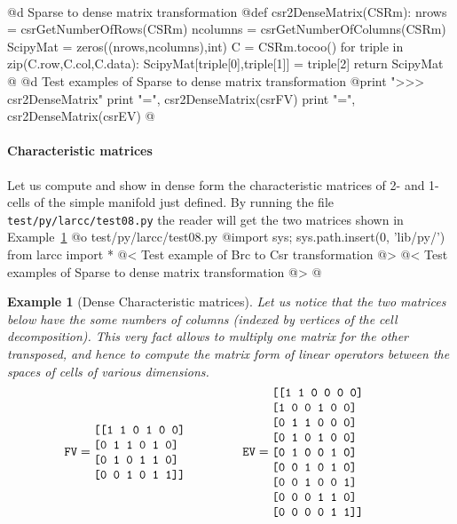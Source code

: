 \documentclass[11pt,oneside]{article}	%
\newtheorem{example}{Example}
\begin{document}
\paragraph{}

@d Sparse to dense matrix transformation
@{def csr2DenseMatrix(CSRm):
    nrows = csrGetNumberOfRows(CSRm)
    ncolumns = csrGetNumberOfColumns(CSRm)
    ScipyMat = zeros((nrows,ncolumns),int)
    C = CSRm.tocoo()
    for triple in zip(C.row,C.col,C.data):
        ScipyMat[triple[0],triple[1]] = triple[2]
    return ScipyMat
@}
@d Test examples of Sparse to dense matrix transformation
@{print "\n>>> csr2DenseMatrix"
print "\nFV =\n", csr2DenseMatrix(csrFV)
print "\nEV =\n", csr2DenseMatrix(csrEV)
@}

\paragraph{Characteristic matrices}
Let us compute and show in dense form the characteristic matrices of 2- and 1-cells of the simple manifold just defined.
By running the file \texttt{test/py/larcc/test08.py} the reader will get the two matrices shown in Example~\ref{ex:denseMat}
@o test/py/larcc/test08.py
@{import sys; sys.path.insert(0, 'lib/py/')
from larcc import *
@< Test example of Brc to Csr transformation @>
@< Test examples of Sparse to dense matrix transformation @>
@}
 
\begin{example}[Dense Characteristic matrices]\label{ex:denseMat}
Let us notice that the two matrices below have the some numbers of columns (indexed by vertices of the cell decomposition).
This very fact allows to multiply one matrix for the other transposed, and hence to compute the matrix form of linear operators between the spaces of cells of various dimensions.
\[
\texttt{FV} =
\begin{minipage}[c]{0.29\linewidth}
\begin{verbatim}
[[1 1 0 1 0 0]
 [0 1 1 0 1 0]
 [0 1 0 1 1 0]
 [0 0 1 0 1 1]]
\end{verbatim}
\end{minipage}
\qquad
\texttt{EV} =
\begin{minipage}[c]{0.29\linewidth}
\begin{verbatim}
[[1 1 0 0 0 0]
 [1 0 0 1 0 0]
 [0 1 1 0 0 0]
 [0 1 0 1 0 0]
 [0 1 0 0 1 0]
 [0 0 1 0 1 0]
 [0 0 1 0 0 1]
 [0 0 0 1 1 0]
 [0 0 0 0 1 1]]
\end{verbatim}
\end{minipage}
\]
\end{example}
\end{document}
